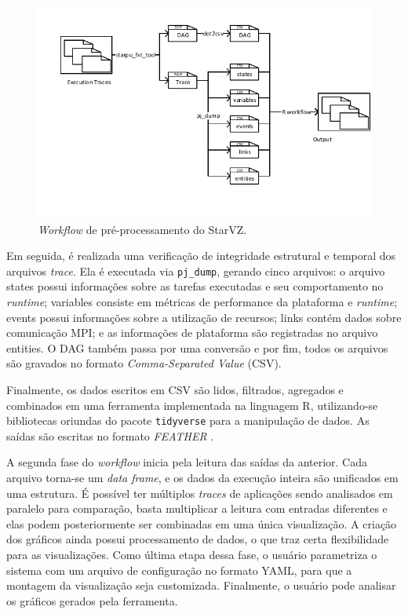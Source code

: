 \begin{figure}[ht]
 \centerline{\includegraphics[width=1\textwidth]{./img/step1-final.pdf}}
 \caption{\emph{Workflow} de pré-processamento do StarVZ.}
 \label{fig:starvz-workflow1}
\end{figure}

Em seguida, é realizada uma verificação de integridade estrutural e temporal dos
arquivos \emph{trace}. Ela é executada via \texttt{pj\_dump}, gerando cinco 
arquivos: o arquivo states 
possui informações sobre as tarefas executadas e seu comportamento no 
\emph{runtime}; variables
consiste em métricas de performance da plataforma e \emph{runtime}; events 
possui informações sobre a 
utilização de recursos; links contém dados sobre comunicação MPI; e as 
informações de plataforma 
são registradas no arquivo entities. O DAG também passa por uma conversão e por 
fim, todos os 
arquivos são gravados no formato \emph{Comma-Separated Value} (CSV).

Finalmente, os dados escritos em CSV são lidos, filtrados, agregados e 
combinados em 
uma ferramenta implementada na linguagem R, utilizando-se bibliotecas oriundas 
do pacote 
\texttt{tidyverse} para a manipulação de dados. As saídas são escritas no 
formato \emph{FEATHER}
\cite{ref:feather}.

A segunda fase do \emph{workflow} inicia pela leitura das saídas da anterior. 
Cada arquivo
torna-se um \emph{data frame}, e os dados da execução inteira são unificados em 
uma estrutura.
É possível ter múltiplos \emph{traces} de aplicações sendo analisados em 
paralelo
para comparação, basta multiplicar a leitura com entradas diferentes e 
elas podem posteriormente ser combinadas em uma única visualização. A criação 
dos gráficos ainda 
possui processamento de dados, o que traz certa flexibilidade para as 
visualizações. Como última etapa dessa fase, o usuário 
parametriza o sistema com um arquivo de configuração no formato YAML, para que 
a 
montagem da visualização seja customizada. Finalmente, o usuário pode analisar 
os gráficos gerados pela ferramenta.

